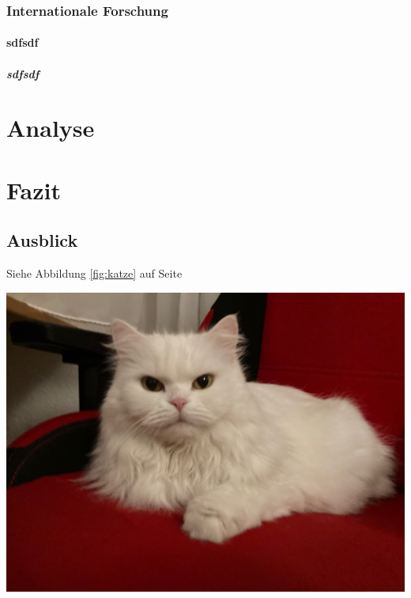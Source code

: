 \documentclass[12pt,ngerman,parskip=half]{scrartcl}
\begin{document}
\subsubsection{Internationale Forschung}

\blindtext

\paragraph{sdfsdf} \blindtext

\subparagraph{sdfsdf} \blindtext


\section{Analyse}

\blindtext[5]

\section{Fazit}

\subsection{Ausblick}\label{sec:ausblick} 

Siehe Abbildung \ref{fig:katze} auf Seite \pageref{fig:katze}

\begin{center}
\includegraphics[width=\textwidth]{Bilder/Katze}
\end{center}
\label{fig:katze2}


\blindtext
\end{document}
